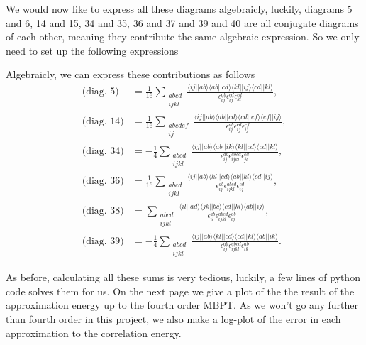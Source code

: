 \documentclass[a4paper, 11pt, notitlepage, english]{article}
\newcommand{\brakket}[2]{\langle #1 || #2 \rangle}
\newcommand{\eps}{\epsilon}
\begin{document}
We would now like to express all these diagrams algebraicly, luckily, diagrams 5 and 6, 14 and 15, 34 and 35, 36 and 37 and 39 and 40 are all conjugate diagrams of each other, meaning they contribute the same algebraic expression. So we only need to set up the following expressions

Algebraicly, we can express these contributions as follows
\begin{align*}
\mbox{(diag.\ 5)} &= \frac{1}{16}\sum_{\substack{abcd \\ ijkl}} 
\frac{\brakket{ij}{ab}\brakket{ab}{cd}\brakket{kl}{ij}\brakket{cd}{kl}}{\eps_{ij}^{ab}\eps_{ij}^{cd}\eps_{kl}^{cd}}, \\[0.2cm]
%
%
\mbox{(diag.\ 14)} &= \frac{1}{16}\sum_{\substack{abcdef \\ ij}} 
\frac{\brakket{ij}{ab}\brakket{ab}{cd}\brakket{cd}{ef}\brakket{ef}{ij}}{\eps_{ij}^{ab}\eps_{ij}^{cd}\eps_{ij}^{ef}}, \\[0.2cm]
%
%
\mbox{(diag.\ 34)} &= -\frac{1}{4}\sum_{\substack{abcd \\ ijkl}} 
\frac{\brakket{ij}{ab}\brakket{ab}{ik}\brakket{kl}{cd}\brakket{cd}{kl}}
{\eps_{ij}^{ab}\eps_{ijkl}^{abcd}\eps_{jl}^{cd}}, \\[0.2cm]
%
%
\mbox{(diag.\ 36)} &= \frac{1}{16}\sum_{\substack{abcd \\ ijkl}} 
\frac{\brakket{ij}{ab}\brakket{kl}{cd}\brakket{ab}{kl}\brakket{cd}{ij}}
{\eps_{ij}^{ab}\eps_{ijkl}^{abcd}\eps_{ij}^{cd}}, \\[0.2cm]
%
%
\mbox{(diag.\ 38)} &= \sum_{\substack{abcd \\ ijkl}} 
\frac{\brakket{il}{ad}\brakket{jk}{bc}\brakket{cd}{kl}\brakket{ab}{ij}}
{\eps_{il}^{ab}\eps_{ijkl}^{abcd}\eps_{ij}^{ab}}, \\[0.2cm]
%
%
\mbox{(diag.\ 39)} &= -\frac{1}{4}\sum_{\substack{abcd \\ ijkl}} 
\frac{\brakket{ij}{ab}\brakket{kl}{cd}\brakket{cd}{kl}\brakket{ab}{ik}}
{\eps_{ij}^{ab}\eps_{ijkl}^{abcd}\eps_{ik}^{ab}}.
\end{align*}

As before, calculating all these sums is very tedious, luckily, a few lines of python code solves them for us. On the next page we give a plot of the the result of the approximation energy up to the fourth order MBPT. As we won't go any further than fourth order in this project, we also make a log-plot of the error in each approximation to the correlation energy.
\end{document}
